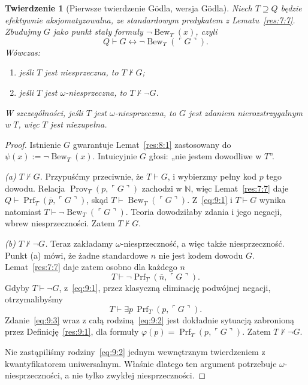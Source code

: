 \documentclass[11pt,a4paper]{article}
\numberwithin{equation}{section}
\theoremstyle{plain}
\newtheorem{twierdzenie}{Twierdzenie}[section]
\theoremstyle{definition}
\theoremstyle{remark}
\begin{document}
\begin{twierdzenie}[Pierwsze twierdzenie Gödla, wersja Gödla]\label{res:9:2}
Niech $T\supseteq Q$ będzie efektywnie aksjomatyzowalna, ze standardowym predykatem z Lematu~\ref{res:7:7}. Zbudujmy $G$ jako punkt stały formuły $\neg\operatorname{Bew}_T(x)$, czyli
\begin{equation}\label{eq:9:1}
Q\vdash G\leftrightarrow\neg\operatorname{Bew}_T(\ulcorner G\urcorner).
\end{equation}
Wówczas:
\begin{enumerate}[label=(\alph*)]
\item jeśli $T$ jest niesprzeczna, to $T\nvdash G$;
\item jeśli $T$ jest $\omega$-niesprzeczna, to $T\nvdash\neg G$.
\end{enumerate}
W szczególności, jeśli $T$ jest $\omega$-niesprzeczna, to $G$ jest zdaniem nierozstrzygalnym w $T$, więc $T$ jest niezupełna.
\end{twierdzenie}
\begin{proof}
Istnienie $G$ gwarantuje Lemat~\ref{res:8:1} zastosowany do $\psi(x):=\neg\operatorname{Bew}_T(x)$. Intuicyjnie $G$ głosi: „nie jestem dowodliwe w $T$”.

\emph{(a) $T\nvdash G$.} Przypuśćmy przeciwnie, że $T\vdash G$, i wybierzmy pełny kod $p$ tego dowodu. Relacja $\operatorname{Prov}_T(p,\ulcorner G\urcorner)$ zachodzi w $\mathbb N$, więc Lemat~\ref{res:7:7} daje $Q\vdash\operatorname{Prf}_T(\overline p,\ulcorner G\urcorner)$, skąd $T\vdash\operatorname{Bew}_T(\ulcorner G\urcorner)$. Z~\eqref{eq:9:1} i $T\vdash G$ wynika natomiast $T\vdash\neg\operatorname{Bew}_T(\ulcorner G\urcorner)$. Teoria dowodziłaby zdania i jego negacji, wbrew niesprzeczności. Zatem $T\nvdash G$.

\emph{(b) $T\nvdash\neg G$.} Teraz zakładamy $\omega$-niesprzeczność, a więc także niesprzeczność. Punkt (a) mówi, że żadne standardowe $n$ nie jest kodem dowodu $G$. Lemat~\ref{res:7:7} daje zatem osobno dla każdego $n$
\begin{equation}\label{eq:9:2}
T\vdash\neg\operatorname{Prf}_T(\overline n,\ulcorner G\urcorner).
\end{equation}
Gdyby $T\vdash\neg G$, z~\eqref{eq:9:1}, przez klasyczną eliminację podwójnej negacji, otrzymalibyśmy
\begin{equation}\label{eq:9:3}
T\vdash\exists p\,\operatorname{Prf}_T(p,\ulcorner G\urcorner).
\end{equation}
Zdanie~\eqref{eq:9:3} wraz z całą rodziną~\eqref{eq:9:2} jest dokładnie sytuacją zabronioną przez Definicję~\ref{res:9:1}, dla formuły $\varphi(p)=\operatorname{Prf}_T(p,\ulcorner G\urcorner)$. Zatem $T\nvdash\neg G$.

Nie zastąpiliśmy rodziny~\eqref{eq:9:2} jednym wewnętrznym twierdzeniem z kwantyfikatorem uniwersalnym. Właśnie dlatego ten argument potrzebuje $\omega$-niesprzeczności, a nie tylko zwykłej niesprzeczności.
\end{proof}
\end{document}
